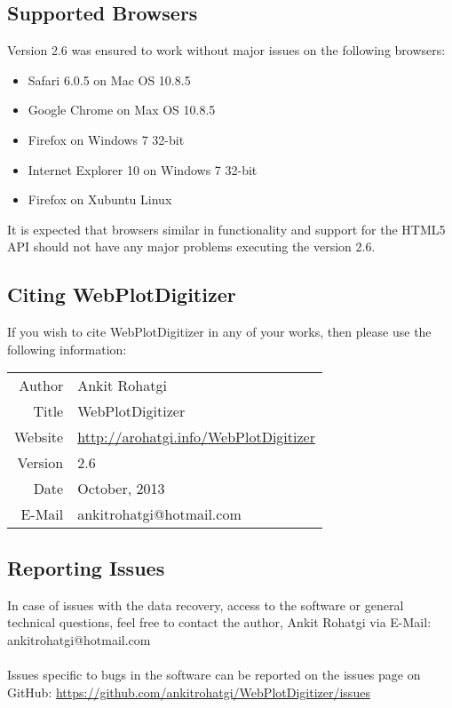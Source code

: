 \documentclass[letterpaper, 10pt]{article}
\begin{document}
\subsection{Supported Browsers}
Version 2.6 was ensured to work without major issues on the following browsers:
\begin{itemize}
\item{Safari 6.0.5 on Mac OS 10.8.5}
\item{Google Chrome on Max OS 10.8.5}
\item{Firefox on Windows 7 32-bit}
\item{Internet Explorer 10 on Windows 7 32-bit}
\item{Firefox on Xubuntu Linux}
\end{itemize}
It is expected that browsers similar in functionality and support for the HTML5 API should not have any major problems executing the version 2.6.

\subsection{Citing WebPlotDigitizer}
If you wish to cite WebPlotDigitizer in any of your works, then please use the following information:

\begin{center}
\begin{tabular}{|r|l|}
\hline
Author & Ankit Rohatgi\\
Title & WebPlotDigitizer\\
Website & \url{http://arohatgi.info/WebPlotDigitizer}\\
Version & 2.6\\
Date & October, 2013\\
E-Mail & ankitrohatgi@hotmail.com\\
\hline
\end{tabular}
\end{center}


\subsection{Reporting Issues}
In case of issues with the data recovery, access to the software or general technical questions, feel free to contact the author, Ankit Rohatgi via E-Mail: ankitrohatgi@hotmail.com
\\
\\
Issues specific to bugs in the software can be reported on the issues page on GitHub: \url{https://github.com/ankitrohatgi/WebPlotDigitizer/issues}
\end{document}
